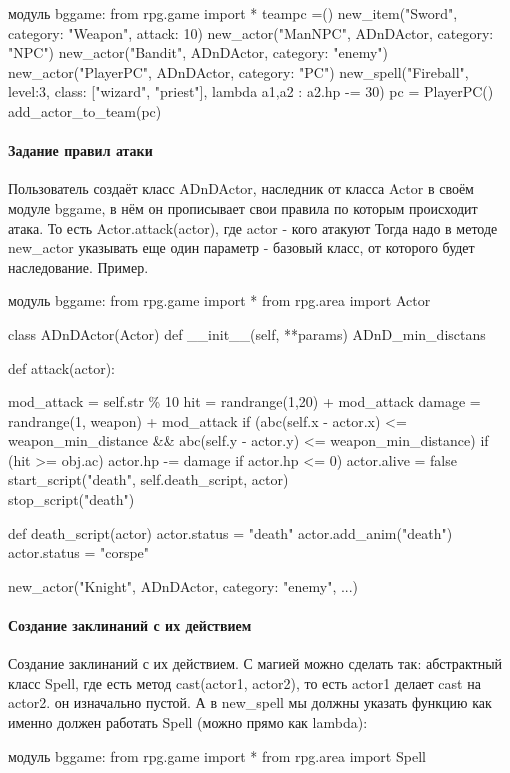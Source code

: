 модуль bggame:
from rpg.game import *
teampc =()
new\_item("Sword", category: "Weapon", attack: 10)
new\_actor("ManNPC", ADnDActor, category: "NPC")
new\_actor("Bandit",  ADnDActor, category: "enemy")
new\_actor("PlayerPC", ADnDActor, category: "PC")
new\_spell("Fireball", level:3, class: ["wizard", "priest"], lambda a1,a2 : a2.hp -= 30)
pc = PlayerPC()
add\_actor\_to\_team(pc)

\paragraph{Задание правил атаки}
Пользователь создаёт класс ADnDActor, наследник от класса Actor в своём модуле bggame, в нём он прописывает свои правила по которым происходит атака. То есть Actor.attack(actor), где actor - кого атакуют
Тогда надо в методе new\_actor указывать еще один параметр - базовый класс, от которого будет наследование.
Пример.

модуль bggame:
from rpg.game import *
from rpg.area import Actor	

class ADnDActor(Actor)
def \_\_init\_\_(self, **params)
ADnD\_min\_disctans

def attack(actor):

	mod\_attack = self.str \% 10
	hit = randrange(1,20) + mod\_attack
	damage = randrange(1, weapon) + mod\_attack
	if (abc(self.x - actor.x) <= weapon\_min\_distance \&\& abc(self.y - actor.y) <= weapon\_min\_distance)
		if (hit >= obj.ac)
		actor.hp -= damage
		if actor.hp <= 0)
			actor.alive = false
			start\_script("death", self.death\_script, actor)\\
			stop\_script("death")

def death\_script(actor)
	actor.status = "death" %
	actor.add\_anim("death")
	actor.status = "corspe" %

new\_actor("Knight", ADnDActor, category: "enemy", ...)

\paragraph{Создание заклинаний с их действием}
Создание заклинаний с их действием. С магией можно сделать так: абстрактный класс Spell, где есть метод cast(actor1, actor2), то есть actor1 делает cast на actor2. он изначально пустой. А в new\_spell мы должны указать функцию как именно должен работать Spell (можно прямо как lambda):

модуль bggame:
from rpg.game import *
from rpg.area import Spell

